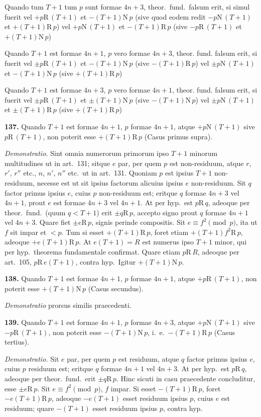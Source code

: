 \documentclass[12pt,a4paper]{article}
\newcommand{\R}{\mbox{R}}
\newcommand{\N}{\mbox{N}}
\begin{document}
Quando tum $T+1$ tum $p$ sunt formae $4n+3$, theor.\ fund.\ falsum erit,
si simul fuerit
vel $+p \R\, (T+1)$ et $-(T+1) \N\, p$
(sive quod eodem redit $-p \N\, (T+1)$ et $+(T+1) \R\, p$)
vel $+p \N\, (T+1)$ et $-(T+1) \R\, p$
(sive $-p \R\, (T+1)$ et $+(T+1) \N\, p$)

Quando $T+1$ est formae $4n+1$, $p$ vero formae $4n+3$, theor. fund. falsum erit, si fuerit
vel $\pm p \R\, (T+1)$ et $-(T+1) \N\,p$ (sive $-(T+1) \R\, p$)
vel $\pm p \N\, (T+1)$ et $-(T+1) \N\,p$ (sive $+(T+1) \R\, p$)


Quando $T+1$ est formae $4n+3$, $p$ vero formae $4n+1$, theor. fund. falsum erit, si fuerit
vel $\pm p \R\, (T+1)$ et $\pm(T+1) \N\, p$ (sive $-(T+1) \N\,p$)
vel $\pm p \N\, (T+1)$ et $\pm(T+1) \R\, p$ (sive $+(T+1) \R\,p$)

\textbf{137.}
Quando $T+1$ est formae $4n+1$, $p$ formae $4n+1$, atque $+p \N\, (T+1)$
sive $p \R\, (T+1)$, non poterit esse $+(T+1) \R\, p$ (Casus primus supra).

\textit{Demonstratio.} Sint omnia numerorum primorum ipso $T+1$ minorum
multitudines ut in art.~131; sitque $e$ par, per quem $p$ est non-residuum, atque
$r$, $r'$, $r''$ etc., $n$, $n'$, $n''$ etc.\ ut in art.~131. Quoniam $p$ est ipsius $T+1$
non-residuum, necesse est ut sit ipsius factorum alicuius ipsius $e$ non-residuum.
Sit $q$ factor primus ipsius $e$, cuius $p$ non-residuum est; eritque $q$ formae
$4n+3$ vel $4n+1$, prout $e$ est formae $4n+3$ vel $4n+1$. At per hyp.\ est
$p \R\, q$, adeoque per theor.\ fund.\ (quum $q < T+1$) erit $\pm q \R\, p$, accepto
signo prout $q$ formae $4n+1$ vel $4n+3$. Quare fiet $\pm e \R\, p$, signis perinde
compositis. Sit $e \equiv f^2 \pmod{p}$, ita ut $f$ sit impar et $< p$. Tum si esset
$+(T+1) \R\, p$, foret etiam $+(T+1)f^2 \R\, p$, adeoque $+e(T+1) \R\, p$.
At $e(T+1) = R$ est numerus ipso $T+1$ minor, qui per hyp.\ theorema
fundamentale confirmat. Quare etiam $p \R\, R$, adeoque per art.~105, $p \R\, e(T+1)$,
contra hyp.\ Igitur $+(T+1) \N\, p$.

\textbf{138.}
Quando $T+1$ est formae $4n+1$, $p$ formae $4n+1$, atque $+p \R\, (T+1)$,
non poterit esse $+(T+1) \N\, p$ (Casus secundus).

\textit{Demonstratio} prorsus similis praecedenti.

\textbf{139.}
Quando $T+1$ est formae $4n+1$, $p$ formae $4n+3$, atque $+p \N\, (T+1)$
sive $-p \R\, (T+1)$, non poterit esse $-(T+1) \N\,p$, i.~e.\ $-(T+1) \R\, p$
(Casus tertius).

\textit{Demonstratio.} Sit $e$ par, per quem $p$ est residuum, atque $q$ factor primus
ipsius $e$, cuius $p$ residuum est; eritque $q$ formae $4n+1$ vel $4n+3$. At per
hyp.\ est $p \R\, q$, adeoque per theor.\ fund.\ erit $\pm q \R\, p$. Hinc sicuti in
casu praecedente concluditur, esse $\pm e \R\, p$. Sit $e \equiv f^2 \pmod{p}$, $f$ impar.
Si esset $-(T+1) \R\, p$, foret $-e(T+1) \R\, p$, adeoque $-e(T+1)$ esset
residuum ipsius $p$, cuius $e$ est residuum; quare $-(T+1)$ esset residuum
ipsius $p$, contra hyp.
\end{document}
